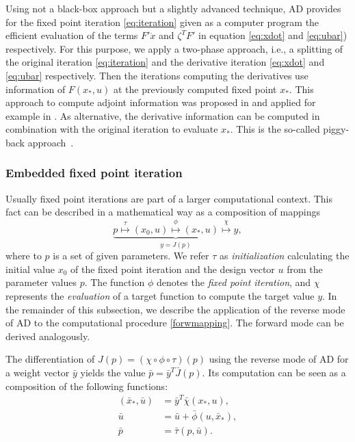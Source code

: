 \documentclass[11pt,twoside]{article}
\begin{document}
Using not a black-box approach but a slightly advanced technique, AD
provides for the fixed point iteration \eqref{eq:iteration} given
as a computer program the efficient evaluation of the terms $F'\dot x$
and $\zeta^TF'$ in equation \eqref{eq:xdot} and \eqref{eq:ubar}) respectively.
For this purpose, we apply a two-phase approach,
i.e., a splitting of the original iteration \eqref{eq:iteration}
and the derivative iteration \eqref{eq:xdot} and \eqref{eq:ubar}
respectively. Then the iterations computing the derivatives use information
of $F(x_*,u)$ at the previously computed fixed point $x_*$. This approach to
compute adjoint information was
proposed in \cite{Chr94} and applied for example in \cite{GKS03}.
As alternative, the derivative information can be computed in combination with
the original iteration to evaluate $x_*$. This is the so-called
piggy-back approach~\cite{GrWa08}.

\subsubsection{Embedded fixed point iteration}
\label{sec:emb}
%
Usually fixed point iterations are part of a larger computational
context. This fact can be described in a mathematical way as a composition of
mappings
\begin{equation}
\label{forwmapping}
 \underbrace{p \stackrel{\tau}{\mapsto} (x_0,u)
   \stackrel{\phi}{\mapsto} (x_*,u)
   \stackrel{\chi}{\mapsto}  y}_{y = J(p)},
\end{equation}
where to $p$ is a set of given parameters.
We refer $\tau$ as \emph{initialization} calculating the initial value
$x_0$ of the fixed point iteration and the design vector $u$ from the
parameter values $p$. The function $\phi$ denotes the \emph{fixed point iteration},
and $\chi$ represents the \emph{evaluation} of a target function to compute the target value
$y$. In the remainder of this subsection, we describe the application of the reverse
mode of AD to the computational procedure \eqref{forwmapping}.
The forward mode can be derived analogously.

The differentiation of $J(p) = (\chi\circ\phi\circ\tau)(p)$ using the reverse
mode of AD for a weight vector $\bar{y}$ yields the value $\bar p =
\bar{y}^T\bar{J}(p)$. Its computation can be seen as a composition
of the following functions:
\begin{align*}
     (\bar x_*, \bar u) &  = \bar{y}^T\bar \chi (x_*,u), \\
    \bar u             & = \bar u + \bar \phi (u,\bar x_*), \\
    \bar p             &  = \bar \tau (p,\bar u).
\end{align*}
\end{document}
